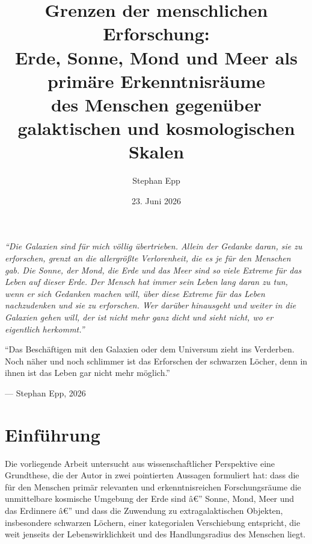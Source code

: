 ﻿\documentclass[a4paper,12pt]{article}
\title{\textbf{Grenzen der menschlichen Erforschung:}\\[0.4em]
\large Erde, Sonne, Mond und Meer als primäre Erkenntnisräume\\
des Menschen gegenüber galaktischen und kosmologischen Skalen}
\author{Stephan Epp}
\date{23. Juni 2026}
\theoremstyle{definition}
\begin{document}
\maketitle

\bigskip

\begin{center}
\begin{minipage}{0.88\textwidth}
\itshape
\small
\enquote{Die Galaxien sind für mich völlig übertrieben. Allein der Gedanke daran,
sie zu erforschen, grenzt an die allergrößte Verlorenheit, die es je für den
Menschen gab. Die Sonne, der Mond, die Erde und das Meer sind so viele Extreme
für das Leben auf dieser Erde. Der Mensch hat immer sein Leben lang daran zu tun,
wenn er sich Gedanken machen will, über diese Extreme für das Leben nachzudenken
und sie zu erforschen. Wer darüber hinausgeht und weiter in die Galaxien gehen
will, der ist nicht mehr ganz dicht und sieht nicht, wo er eigentlich herkommt.}

\medskip

\enquote{Das Beschäftigen mit den Galaxien oder dem Universum zieht ins Verderben.
Noch näher und noch schlimmer ist das Erforschen der schwarzen Löcher, denn in
ihnen ist das Leben gar nicht mehr möglich.}

\smallskip
\hfill --- \textup{Stephan Epp}, 2026
\end{minipage}
\end{center}

\bigskip

\tableofcontents
\newpage

\section{Einführung}

Die vorliegende Arbeit untersucht aus wissenschaftlicher Perspektive eine
Grundthese, die der Autor in zwei pointierten Aussagen formuliert hat: dass die
für den Menschen primär relevanten und erkenntnisreichen Forschungsräume die
unmittelbare kosmische Umgebung der Erde sind â€” Sonne, Mond, Meer und das
Erdinnere â€” und dass die Zuwendung zu extragalaktischen Objekten, insbesondere
schwarzen Löchern, einer kategorialen Verschiebung entspricht, die weit jenseits
der Lebenswirklichkeit und des Handlungsradius des Menschen liegt.
\end{document}
